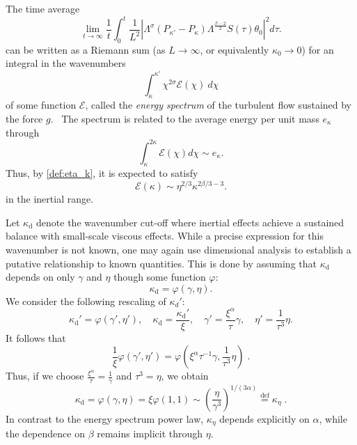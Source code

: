 \documentclass[twoside, reqno]{amsart}
\numberwithin{lemma}{section}
\numberwithin{theorem}{section}
\numberwithin{proposition}{section}
\numberwithin{equation}{section} %
\newcommand{\te}{\theta}
\newcommand{\ga}{\gamma}
\newcommand{\la}{\Lambda}
\newcommand{\ka}{\kappa}
\newcommand{\kapd}{\kap_{\textrm{d}}}
\newcommand{\kap}{\kappa}
\begin{document}
The time average
\begin{equation*}
    \lim_{t \to \infty} \frac{1}{t} \int_0^t \frac{1}{L^2} |\la^{\sigma} (P_{\ka'}-P_{\ka}) \la^{\frac{\beta-2}{2}}S(\tau)\te_0|^2d\tau .
\end{equation*}
can be written as a Riemann sum (as $L\to \infty$, or equivalently $\ka_0\to 0$) for an integral in the wavenumbers
\begin{equation}\label{eq:spectrum:riemann}
    \int_{\ka}^{\ka'} \chi^{2\sigma} \mathcal{E} (\chi)\ d\chi
\end{equation}
of some function $\mathcal{E}$, called the {\it energy spectrum} of the turbulent flow sustained by the force $g$.  \
The spectrum is related to the average energy per unit mass $e_{\kappa}$ through
\begin{equation*}
     \int_{\ka}^{2\ka} \mathcal{E} (\chi) d\chi \sim e_{\ka}  .
\end{equation*}
{Thus, by \eqref{def:eta_k},
it is} expected to satisfy
    \begin{equation} \label{main:ES}
    \mathcal{E}(\kappa) \sim \eta^{2/3}\ka^{2\beta/{3}-3} .
    \end{equation}
in the inertial range.  
  
Let ${\kapd}$ denote {the wavenumber cut-off} where inertial effects {achieve a sustained balance with small-scale} viscous effects.  While {a} precise expression for this wavenumber is not known, {one may} again use dimensional analysis to {establish a putative relationship} to known quantities.  This is done by assuming {that $\kap_{\text{d}}$} depends on only  $ \gamma $ and $ \eta $ though some function $\varphi$:
\[
{\kapd} = \varphi(\gamma, \eta).
\]
We consider the following rescaling of $\kap_d'$:
\begin{equation*}
    {\kapd'} = \varphi(\ga',\eta'), \quad {\kapd} = \frac{{\kapd'}}{\xi},\quad  \ga' = \frac{\xi^{\alpha}}{\tau}\ga, \quad \eta' = \frac{1}{\tau^3} \eta.
\end{equation*}
It follows that
\begin{equation*}
    \frac{1}{\xi}\varphi(\ga',\eta') = \varphi(\xi^{\alpha}\tau^{-1}\ga,\frac{1}{\tau^3} \eta)\;.
\end{equation*}
Thus, if we choose $\frac{\xi^{\alpha}}{\tau} = \frac{1}{\ga}$ and $\tau^3 = \eta$, we obtain
\begin{equation} \label{def:keta}
    {\kapd} = \varphi(\ga,\eta) = \xi \varphi(1,1) \sim \left(\frac{\eta}{\ga^3} \right)^{1/(3\alpha)} \overset{\text{def}}{=} \ka_\eta \;.
\end{equation}
In contrast to the energy spectrum power law, $\kappa_\eta$ depends explicitly on  $\alpha$, {while the} dependence on $\beta$ {remains} implicit through $\eta$.
\end{document}
